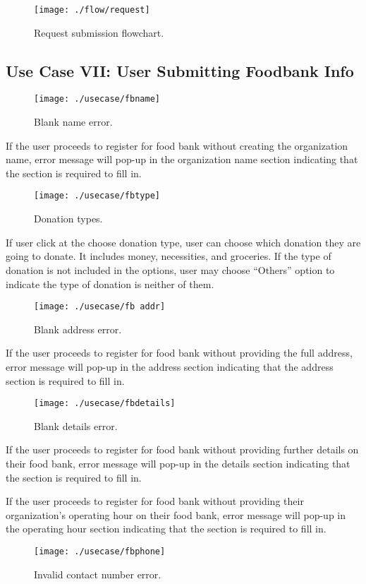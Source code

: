 \documentclass[conference]{IEEEtran}
\begin{document}
\begin{figure}[h!]
\texttt{[image: ./flow/request]}
\centering
\caption{Request submission flowchart.}
\end{figure}

\subsection{Use Case VII: User Submitting Foodbank Info}

\begin{figure}[h!]
\texttt{[image: ./usecase/fbname]}
\centering
\caption{Blank name error.}
\end{figure}

If the user proceeds to register for food bank without creating the organization name, error message will pop-up in the organization name section indicating that the section is required to fill in. 
\begin{figure}[h!]
\texttt{[image: ./usecase/fbtype]}
\centering
\caption{Donation types.}
\end{figure}

If user click at the choose donation type, user can choose which donation they are going to donate. It includes money, necessities, and groceries. If the type of donation is not included in the options, user may choose “Others” option to indicate the type of donation is neither of them.
\begin{figure}[h!]
\texttt{[image: ./usecase/fb addr]}
\centering
\caption{Blank address error.}
\end{figure}

If the user proceeds to register for food bank without providing the full address, error message will pop-up in the address section indicating that the address section is required to fill in.
\begin{figure}[h!]
\texttt{[image: ./usecase/fbdetails]}
\centering
\caption{Blank details error.}
\end{figure}

If the user proceeds to register for food bank without providing further details on their food bank, error message will pop-up in the details section indicating that the section is required to fill in.

If the user proceeds to register for food bank without providing their organization’s operating hour on their food bank, error message will pop-up in the operating hour section indicating that the section is required to fill in.
\begin{figure}[h!]
\texttt{[image: ./usecase/fbphone]}
\centering
\caption{Invalid contact number error.}
\end{figure}
\end{document}
